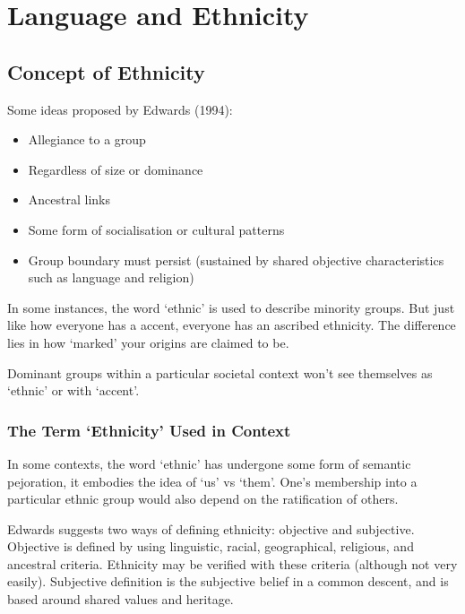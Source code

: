 \documentclass[../main.tex]{subfiles}
\begin{document}
    \chapter{Language and Ethnicity}
    \section{Concept of Ethnicity}
    Some ideas proposed by Edwards (1994): \begin{itemize}
        \item Allegiance to a group
        \item Regardless of size or dominance
        \item Ancestral links
        \item Some form of socialisation or cultural patterns
        \item Group boundary must persist (sustained by shared objective characteristics such as language and religion)
    \end{itemize}
    In some instances, the word `ethnic' is used to describe minority groups. But just like how everyone has a accent, everyone has an ascribed ethnicity. The difference lies in how `marked' your origins are claimed to be. \par 
    Dominant groups within a particular societal context won't see themselves as `ethnic' or with `accent'.

    \subsection{The Term `Ethnicity' Used in Context}
    In some contexts, the word `ethnic' has undergone some form of semantic pejoration, it embodies the idea of `us' vs `them'. One's membership into a particular ethnic group would also depend on the ratification of others. \par
    Edwards suggests two ways of defining ethnicity: objective and subjective.
    Objective is defined by using linguistic, racial, geographical, religious, and ancestral criteria. Ethnicity may be verified with these criteria (although not very easily). Subjective definition is the subjective belief in a common descent, and is based around shared values and heritage.
\end{document}
